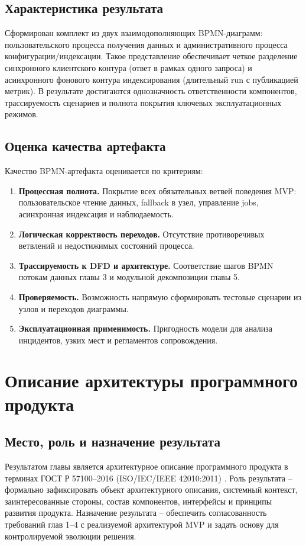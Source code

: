 ﻿\documentclass[14pt,a4paper]{extarticle}
\begin{document}
\subsection{Характеристика результата}
\noindent Сформирован комплект из двух взаимодополняющих BPMN-диаграмм: пользовательского процесса получения данных и административного процесса конфигурации/индексации. Такое представление обеспечивает четкое разделение синхронного клиентского контура (ответ в рамках одного запроса) и асинхронного фонового контура индексирования (длительный run с публикацией метрик). В результате достигаются однозначность ответственности компонентов, трассируемость сценариев и полнота покрытия ключевых эксплуатационных режимов.

\subsection{Оценка качества артефакта}
\noindent Качество BPMN-артефакта оценивается по критериям:
\begin{enumerate}
  \item \textbf{Процессная полнота.} Покрытие всех обязательных ветвей поведения MVP: пользовательское чтение данных, fallback в узел, управление jobs, асинхронная индексация и наблюдаемость.
  \item \textbf{Логическая корректность переходов.} Отсутствие противоречивых ветвлений и недостижимых состояний процесса.
  \item \textbf{Трассируемость к DFD и архитектуре.} Соответствие шагов BPMN потокам данных главы 3 и модульной декомпозиции главы 5.
  \item \textbf{Проверяемость.} Возможность напрямую сформировать тестовые сценарии из узлов и переходов диаграммы.
  \item \textbf{Эксплуатационная применимость.} Пригодность модели для анализа инцидентов, узких мест и регламентов сопровождения.
\end{enumerate}

\newpage

\section{Описание архитектуры программного продукта}

\subsection{Место, роль и назначение результата}
\noindent Результатом главы является архитектурное описание программного продукта в терминах ГОСТ Р 57100--2016 (ISO/IEC/IEEE 42010:2011) \cite{src_gost_57100}. Роль результата -- формально зафиксировать объект архитектурного описания, системный контекст, заинтересованные стороны, состав компонентов, интерфейсы и принципы развития продукта. Назначение результата -- обеспечить согласованность требований глав 1--4 с реализуемой архитектурой MVP и задать основу для контролируемой эволюции решения.
\end{document}
